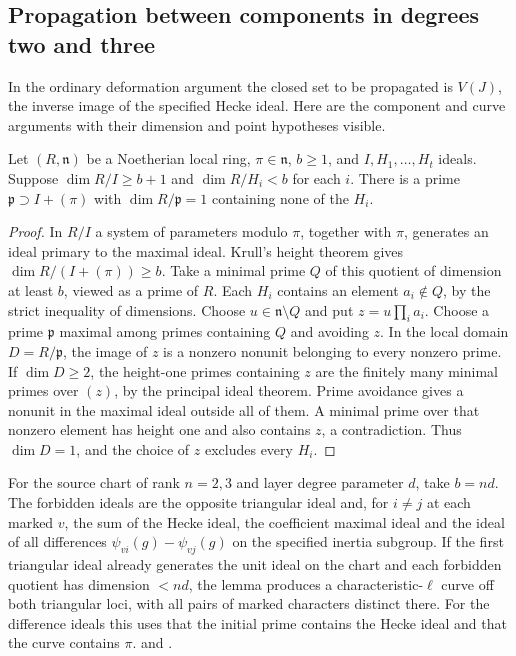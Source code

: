 \subsection{Propagation between components in degrees two and three}

In the ordinary deformation argument the closed set to be propagated
is \(V(J)\), the inverse image of the specified Hecke ideal.
Here are the component and curve arguments with their dimension and
point hypotheses visible.

\begin{lemma}\label{cprop:curve}
Let \((R,\mathfrak n)\) be a Noetherian local ring, \(\pi\in\mathfrak n\),
\(b\ge1\), and \(I,H_1,\ldots,H_t\) ideals. Suppose
\(\dim R/I\ge b+1\) and \(\dim R/H_i<b\) for each \(i\).
There is a prime \(\mathfrak p\supset I+(\pi)\) with
\(\dim R/\mathfrak p=1\) containing none of the \(H_i\).
\end{lemma}
\begin{proof}
In \(R/I\) a system of parameters modulo \(\pi\), together with
\(\pi\), generates an ideal primary to the maximal ideal.
Krull's height theorem gives \(\dim R/(I+(\pi))\ge b\). Take a
minimal prime \(Q\) of this quotient of dimension at least \(b\),
viewed as a prime of \(R\). Each \(H_i\) contains an element
\(a_i\notin Q\), by the strict inequality of dimensions.
Choose \(u\in\mathfrak n\setminus Q\) and put \(z=u\prod_i a_i\).
Choose a prime \(\mathfrak p\) maximal among primes containing \(Q\)
and avoiding \(z\). In the local domain \(D=R/\mathfrak p\), the
image of \(z\) is a nonzero nonunit belonging to every nonzero prime.
If \(\dim D\ge2\), the height-one primes containing \(z\) are the
finitely many minimal primes over \((z)\), by the principal ideal
theorem. Prime avoidance gives a nonunit in the maximal ideal
outside all of them. A minimal prime over that nonzero element
has height one and also contains \(z\), a contradiction. Thus
\(\dim D=1\), and the choice of \(z\) excludes every \(H_i\).
\end{proof}
For the source chart of rank \(n=2,3\) and layer degree parameter
\(d\), take \(b=nd\). The forbidden ideals are the opposite triangular
ideal and, for \(i\ne j\) at each marked \(v\), the sum of the Hecke
ideal, the coefficient maximal ideal and the ideal of all differences
\(\psi_{vi}(g)-\psi_{vj}(g)\) on the specified inertia subgroup.
If the first triangular ideal already generates the unit ideal on
the chart and each forbidden quotient has dimension \(<nd\), the
lemma produces a characteristic-\(\ell\) curve off both triangular
loci, with all pairs of marked characters distinct there. For
the difference ideals this uses that the initial prime contains
the Hecke ideal and that the curve contains \(\pi\).
 and
.


